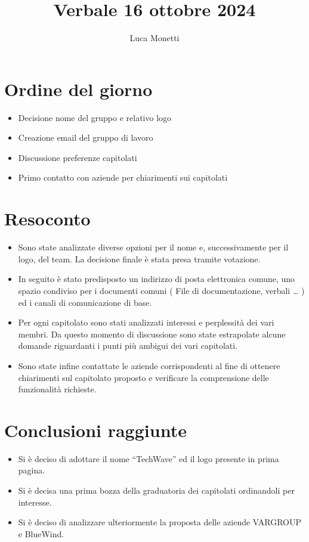 \documentclass{TWReport}
\title{Verbale 16 ottobre 2024}
\author{Luca Monetti}
\begin{document}
\frontmatter

\showPartecipants

\section*{Ordine del giorno}
\begin{itemize}
    \item Decisione nome del gruppo e relativo logo
    \item Creazione email del gruppo di lavoro
    \item Discussione preferenze capitolati
    \item Primo contatto con aziende per chiarimenti sui capitolati
\end{itemize}

\section*{Resoconto}
\begin{itemize}
    \item Sono state analizzate diverse opzioni per il nome e, successivamente per il logo, del team. La decisione finale è stata presa tramite votazione.
    \item In seguito è stato predisposto un indirizzo di posta elettronica comune, uno spazio condiviso per i documenti comuni ( File di documentazione, verbali … ) ed i canali di comunicazione di base.
    \item Per ogni capitolato sono stati analizzati interessi e perplessità dei vari membri. Da questo momento di discussione sono state estrapolate alcune domande riguardanti i punti più ambigui dei vari capitolati.
    \item Sono state infine contattate le aziende corrispondenti al fine di ottenere chiarimenti sul capitolato proposto e verificare la comprensione delle funzionalità richieste.
    
\end{itemize}

\section*{Conclusioni raggiunte}
\begin{itemize}
    \item Si è deciso di adottare il nome “TechWave” ed il logo presente in prima pagina.
    \item Si è decisa una prima bozza della graduatoria dei capitolati ordinandoli per interesse.
    \item Si è deciso di analizzare ulteriormente la proposta delle aziende VARGROUP e BlueWind.
\end{itemize}
\end{document}
